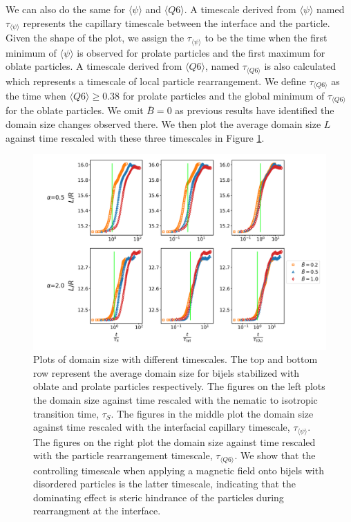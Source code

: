 We can also do the same for \(\langle \psi \rangle\) and
\(\langle Q6 \rangle\). A timescale derived from
\(\langle \psi \rangle\) named \(\tau_{\langle \psi \rangle}\)
represents the capillary timescale between the interface and the
particle. Given the shape of the plot, we assign the
\(\tau_{\langle \psi \rangle}\) to be the time when the first minimum of
\(\langle \psi \rangle\) is observed for prolate particles and the first
maximum for oblate particles. A timescale derived from
\(\langle Q6 \rangle\), named \(\tau_{\langle Q6 \rangle}\) is also
calculated which represents a timescale of local particle rearrangement.
We define \(\tau_{\langle Q6 \rangle}\) as the time when
\(\langle Q6 \rangle \geq 0.38\) for prolate particles and the global
minimum of \(\tau_{\langle Q6 \rangle}\) for the oblate particles. We
omit \(\bar{B} = 0\) as previous results have identified the domain size
changes observed there. We then plot the average domain size \(L\)
against time rescaled with these three timescales in Figure
\ref{fig:domain_size-field_on-scaled}.

\begin{figure} 
\centering 
\includegraphics[scale=0.4]{../figures/results/paper2/domain_size-field_on-scaled.png} 
\caption{Plots of domain size with different timescales. The top and bottom row represent the average domain size for bijels stabilized with oblate and prolate particles respectively. The figures on the left plots the domain size against time rescaled with the nematic to isotropic transition time, $\tau_S$. The figures in the middle plot the domain size against time rescaled with the interfacial capillary timescale, $\tau_{\langle \psi \rangle}$. The figures on the right plot the domain size against time rescaled with the particle rearrangement timescale, $\tau_{\langle Q6 \rangle}$. We show that the controlling timescale when applying a magnetic field onto bijels with disordered particles is the latter timescale, indicating that the dominating effect is steric hindrance of the particles during rearrangment at the interface.} 
\label{fig:domain_size-field_on-scaled} 
\end{figure}

